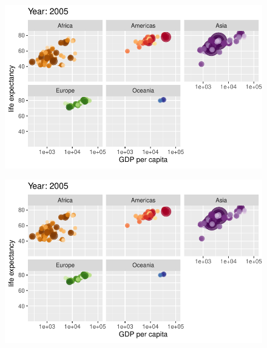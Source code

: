 \documentclass[
  letterpaper,
  DIV=11,
  numbers=noendperiod]{scrartcl}
\begin{document}
\begin{figure}[H]

{\centering \includegraphics{class05_files/figure-pdf/unnamed-chunk-24-96.pdf}

}

\end{figure}

\begin{figure}[H]

{\centering \includegraphics{class05_files/figure-pdf/unnamed-chunk-24-97.pdf}

}

\end{figure}
\end{document}
